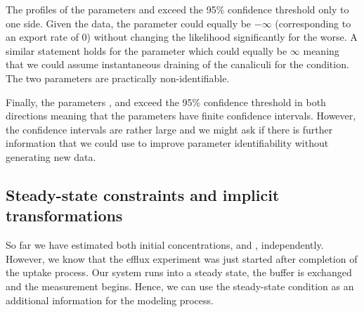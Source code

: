 \documentclass[article]{jss}
\begin{document}
The profiles of the parameters  and  exceed the 95\% confidence threshold only to one side. Given the data, the  parameter could equally be $-\infty$ (corresponding to an export rate of 0) without changing the likelihood significantly for the worse. A similar statement holds for the  parameter which could equally be $\infty$ meaning that we could assume instantaneous draining of the canaliculi for the  condition. The two parameters are practically non-identifiable.

Finally, the parameters ,  and  exceed the 95\% confidence threshold in both directions meaning that the parameters have finite confidence intervals. However, the confidence intervals are rather large and we might ask if there is further information that we could use to improve parameter identifiability without generating new data.

\subsection{Steady-state constraints and implicit transformations}
\label{chap_steady_state}

So far we have estimated both initial concentrations,  and , independently. However, we know that the efflux experiment was just started after completion of the uptake process. Our system runs into a steady state, the buffer is exchanged and the measurement begins. Hence, we can use the steady-state condition as an additional information for the modeling process.
\end{document}
